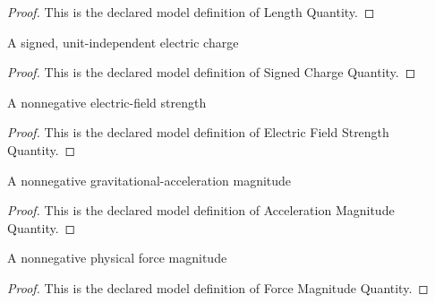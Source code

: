 \begin{proof}
  This is the declared model definition of Length Quantity.
\end{proof}
\begin{definition}
  \label{def:physics:phyx-mini-0906:phyxminiproblems-problemphyxmini0906-signedchargequantity}
  A signed, unit-independent electric charge
\end{definition}
\begin{proof}
  This is the declared model definition of Signed Charge Quantity.
\end{proof}
\begin{definition}
  \label{def:physics:phyx-mini-0906:phyxminiproblems-problemphyxmini0906-electricfieldstrengthquantity}
  A nonnegative electric-field strength
\end{definition}
\begin{proof}
  This is the declared model definition of Electric Field Strength Quantity.
\end{proof}
\begin{definition}
  \label{def:physics:phyx-mini-0906:phyxminiproblems-problemphyxmini0906-accelerationmagnitudequantity}
  A nonnegative gravitational-acceleration magnitude
\end{definition}
\begin{proof}
  This is the declared model definition of Acceleration Magnitude Quantity.
\end{proof}
\begin{definition}
  \label{def:physics:phyx-mini-0906:phyxminiproblems-problemphyxmini0906-forcemagnitudequantity}
  A nonnegative physical force magnitude
\end{definition}
\begin{proof}
  This is the declared model definition of Force Magnitude Quantity.
\end{proof}
